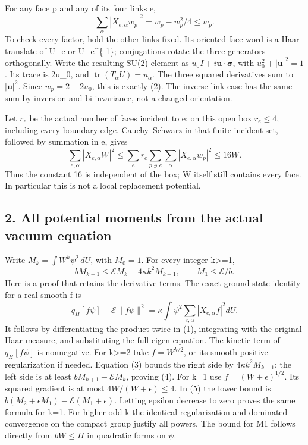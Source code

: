 \documentclass[
  11pt,
]{article}
\begin{document}
For any face p and any of its four links e, \[
 \sum_\alpha|X_{e,\alpha}w_p|^2=w_p-w_p^2/4\le w_p.       \tag{2}
\] To check every factor, hold the other links fixed. Its oriented face
word is a Haar translate of U\_e or U\_e\^{}\{-1\}; conjugations rotate
the three generators orthogonally. Write the resulting SU(2) element as
\(u_0I+i\boldsymbol u\cdot\boldsymbol\sigma\), with
\(u_0^2+|\boldsymbol u|^2=1\). Its trace is 2u\_0, and
\(\operatorname{tr}(T_\alpha U)=u_\alpha\). The three squared
derivatives sum to \(|\boldsymbol u|^2\). Since \(w_p=2-2u_0\), this is
exactly (2). The inverse-link case has the same sum by inversion and
bi-invariance, not a changed orientation.

Let \(r_e\) be the actual number of faces incident to e; on this open
box \(r_e\le4\), including every boundary edge. Cauchy--Schwarz in that
finite incident set, followed by summation in e, gives \[
 \sum_{e,\alpha}|X_{e,\alpha}W|^2
  \le\sum_e r_e\sum_{p\ni e}\sum_\alpha|X_{e,\alpha}w_p|^2
  \le16W.                                                   \tag{3}
\] Thus the constant 16 is independent of the box; W itself still
contains every face. In particular this is not a local replacement
potential.

\subsection{2. All potential moments from the actual vacuum
equation}\label{weak-coupling-part-3-all-potential-moments-from-the-actual-vacuum-equation}

Write \(M_k=\int W^k\psi^2\,dU\), with \(M_0=1\). For every integer
k\textgreater=1, \[
 \boxed{bM_{k+1}\le\mathcal E M_k+4\kappa k^2M_{k-1},
 \qquad M_1\le\mathcal E/b.}                              \tag{4}
\] Here is a proof that retains the derivative terms. The exact
ground-state identity for a real smooth f is \[
 q_H[f\psi]-\mathcal E\|f\psi\|^2
   =\kappa\int\psi^2\sum_{e,\alpha}|X_{e,\alpha}f|^2dU.
                                                               \tag{5}
\] It follows by differentiating the product twice in (1), integrating
with the original Haar measure, and substituting the full
eigen-equation. The kinetic term of \(q_H[f\psi]\) is nonnegative. For
k\textgreater=2 take \(f=W^{k/2}\), or its smooth positive
regularization if needed. Equation (3) bounds the right side by
\(4\kappa k^2M_{k-1}\); the left side is at least
\(bM_{k+1}-\mathcal E M_k\), proving (4). For k=1 use
\(f=(W+\epsilon)^{1/2}\). Its squared gradient is at most
\(4W/(W+\epsilon)\le4\). In (5) the lower bound is
\(b(M_2+\epsilon M_1)-\mathcal E(M_1+\epsilon)\). Letting epsilon
decrease to zero proves the same formula for k=1. For higher odd k the
identical regularization and dominated convergence on the compact group
justify all powers. The bound for M1 follows directly from \(bW\le H\)
in quadratic forms on \(\psi\).
\end{document}
